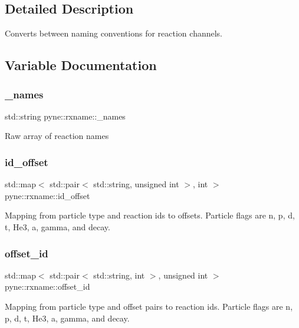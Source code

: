 \subsection{Detailed Description}
Converts between naming conventions for reaction channels. 

\subsection{Variable Documentation}
\mbox{\label{namespacepyne_1_1rxname_a880e1a059fe54b6fd425cc3319978555}} 
\subsubsection{\texorpdfstring{\+\_\+names}{\_names}}
{\footnotesize\ttfamily std\+::string pyne\+::rxname\+::\+\_\+names}

Raw array of reaction names \mbox{\label{namespacepyne_1_1rxname_ae2f5760c11dc39df3f90fbcc6584c95c}} 
\subsubsection{\texorpdfstring{id\+\_\+offset}{id\_offset}}
{\footnotesize\ttfamily std\+::map$<$ std\+::pair$<$ std\+::string, unsigned int $>$, int $>$ pyne\+::rxname\+::id\+\_\+offset}

Mapping from particle type and reaction ids to offsets. Particle flags are \textquotesingle{}n\textquotesingle{}, \textquotesingle{}p\textquotesingle{}, \textquotesingle{}d\textquotesingle{}, \textquotesingle{}t\textquotesingle{}, \textquotesingle{}He3\textquotesingle{}, \textquotesingle{}a\textquotesingle{}, \textquotesingle{}gamma\textquotesingle{}, and \textquotesingle{}decay\textquotesingle{}. \mbox{\label{namespacepyne_1_1rxname_a699be84310dad599582278e04135326e}} 
\subsubsection{\texorpdfstring{offset\+\_\+id}{offset\_id}}
{\footnotesize\ttfamily std\+::map$<$ std\+::pair$<$ std\+::string, int $>$, unsigned int $>$ pyne\+::rxname\+::offset\+\_\+id}

Mapping from particle type and offset pairs to reaction ids. Particle flags are \textquotesingle{}n\textquotesingle{}, \textquotesingle{}p\textquotesingle{}, \textquotesingle{}d\textquotesingle{}, \textquotesingle{}t\textquotesingle{}, \textquotesingle{}He3\textquotesingle{}, \textquotesingle{}a\textquotesingle{}, \textquotesingle{}gamma\textquotesingle{}, and \textquotesingle{}decay\textquotesingle{}. 